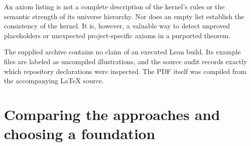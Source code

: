 \documentclass[11pt,letterpaper]{article}
\numberwithin{equation}{section}
\theoremstyle{definition}
\theoremstyle{remark}
\begin{document}
An axiom listing is not a complete description of the kernel's rules or the semantic strength of its universe hierarchy. Nor does an empty list establish the consistency of the kernel. It is, however, a valuable way to detect unproved placeholders or unexpected project-specific axioms in a purported theorem.

The supplied archive contains no claim of an executed Lean build. Its example files are labeled as uncompiled illustrations, and the source audit records exactly which repository declarations were inspected. The PDF itself was compiled from the accompanying LaTeX source.

\section{Comparing the approaches and choosing a foundation}\label{sec:comparison}
\end{document}
